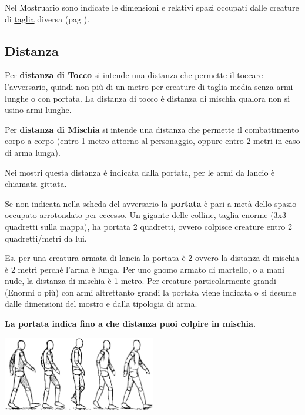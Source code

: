 \begin{multicols}{2}
Nel Mostruario sono indicate le dimensioni e relativi spazi occupati dalle creature di \hyperlink{tagliaedimensioni}{taglia} diversa (pag \pageref{tagliaedimensioni}).

\subsection{Distanza}\label{distanza}

Per \textbf{distanza di Tocco}  si intende una distanza che permette il toccare l'avversario, quindi non più di un metro per creature di taglia media senza armi lunghe o con portata. La distanza di tocco è distanza di mischia qualora non si usino armi lunghe.

Per \textbf{distanza di Mischia}  si intende una distanza che permette il combattimento corpo a corpo (entro 1 metro attorno al personaggio, oppure entro 2 metri in caso di arma lunga).

Nei mostri questa distanza è indicata dalla portata, per le armi da lancio è chiamata gittata.

Se non indicata nella scheda del avversario la \textbf{portata} è pari a metà dello spazio occupato arrotondato per eccesso. Un gigante delle colline, taglia enorme (3x3 quadretti sulla mappa), ha portata 2 quadretti, ovvero colpisce creature entro 2 quadretti/metri da lui.

\begin{changemargin}{0.3cm}{0.3cm}\begin{tcolorbox}[title = Esempi di Distanza in Combattimento]
Es. per una creatura armata di lancia la portata è 2 ovvero la distanza di mischia è 2 metri perché l'arma è lunga. Per uno gnomo armato di martello, o a mani nude, la distanza di mischia è 1 metro. Per creature particolarmente grandi (Enormi o più) con armi altrettanto grandi la portata viene indicata o si desume dalle dimensioni del mostro e dalla tipologia di arma.

\textbf{La portata indica fino a che distanza puoi colpire in mischia.}
\end{tcolorbox}\end{changemargin}

\end{multicols}

\vfill

\begin{center}
	\includegraphics[width=0.5\textwidth]{immagini/camminata.png}
\end{center}

